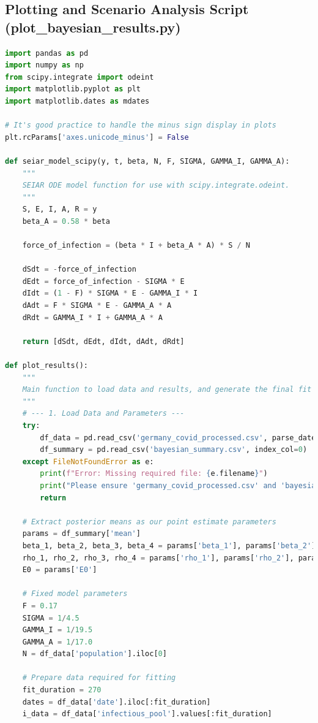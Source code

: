 \documentclass[12pt, a4paper]{article}
\begin{document}
\subsection{Plotting and Scenario Analysis Script (plot\_bayesian\_results.py)}
\begin{lstlisting}[language=Python, caption=Python script for plotting the Bayesian model fit and running the scenario analysis.]
import pandas as pd
import numpy as np
from scipy.integrate import odeint
import matplotlib.pyplot as plt
import matplotlib.dates as mdates

# It's good practice to handle the minus sign display in plots
plt.rcParams['axes.unicode_minus'] = False

def seiar_model_scipy(y, t, beta, N, F, SIGMA, GAMMA_I, GAMMA_A):
    """
    SEIAR ODE model function for use with scipy.integrate.odeint.
    """
    S, E, I, A, R = y
    beta_A = 0.58 * beta
    
    force_of_infection = (beta * I + beta_A * A) * S / N
    
    dSdt = -force_of_infection
    dEdt = force_of_infection - SIGMA * E
    dIdt = (1 - F) * SIGMA * E - GAMMA_I * I
    dAdt = F * SIGMA * E - GAMMA_A * A
    dRdt = GAMMA_I * I + GAMMA_A * A
    
    return [dSdt, dEdt, dIdt, dAdt, dRdt]

def plot_results():
    """
    Main function to load data and results, and generate the final fit plot.
    """
    # --- 1. Load Data and Parameters ---
    try:
        df_data = pd.read_csv('germany_covid_processed.csv', parse_dates=['date'])
        df_summary = pd.read_csv('bayesian_summary.csv', index_col=0)
    except FileNotFoundError as e:
        print(f"Error: Missing required file: {e.filename}")
        print("Please ensure 'germany_covid_processed.csv' and 'bayesian_summary.csv' are in the current directory.")
        return

    # Extract posterior means as our point estimate parameters
    params = df_summary['mean']
    beta_1, beta_2, beta_3, beta_4 = params['beta_1'], params['beta_2'], params['beta_3'], params['beta_4']
    rho_1, rho_2, rho_3, rho_4 = params['rho_1'], params['rho_2'], params['rho_3'], params['rho_4']
    E0 = params['E0']
    
    # Fixed model parameters
    F = 0.17
    SIGMA = 1/4.5
    GAMMA_I = 1/19.5
    GAMMA_A = 1/17.0
    N = df_data['population'].iloc[0]

    # Prepare data required for fitting
    fit_duration = 270
    dates = df_data['date'].iloc[:fit_duration]
    i_data = df_data['infectious_pool'].values[:fit_duration]


\end{lstlisting}
\end{document}
